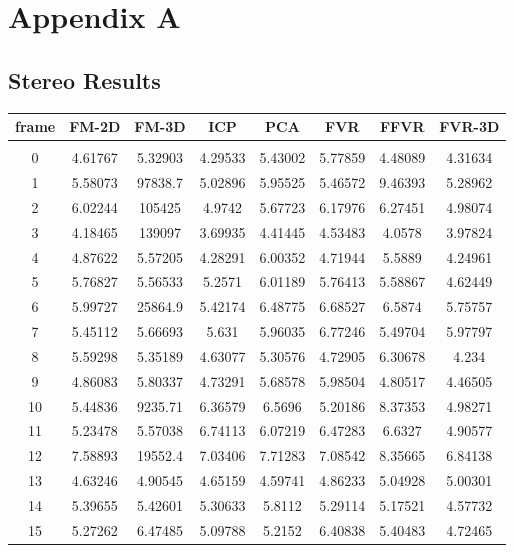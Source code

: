 \makeatletter
\chapter{Appendix A}
\label{RawQuantitative1}

\section{Stereo Results}
\label{StereoResultsRaw}

\begin{center}
\begin{longtable}{cccccccc}
\hline
\textbf{frame} & \textbf{FM-2D} & \textbf{FM-3D} & \textbf{ICP} & \textbf{PCA} & \textbf{FVR} & \textbf{FFVR} & \textbf{FVR-3D} \\
\hline \\
0 & 4.61767 & 5.32903 & 4.29533 & 5.43002 & 5.77859 & 4.48089 & 4.31634\\
1 & 5.58073 & 97838.7 & 5.02896 & 5.95525 & 5.46572 & 9.46393 & 5.28962\\
2 & 6.02244 & 105425 & 4.9742 & 5.67723 & 6.17976 & 6.27451 & 4.98074\\
3 & 4.18465 & 139097 & 3.69935 & 4.41445 & 4.53483 & 4.0578 & 3.97824\\
4 & 4.87622 & 5.57205 & 4.28291 & 6.00352 & 4.71944 & 5.5889 & 4.24961\\
5 & 5.76827 & 5.56533 & 5.2571 & 6.01189 & 5.76413 & 5.58867 & 4.62449\\
6 & 5.99727 & 25864.9 & 5.42174 & 6.48775 & 6.68527 & 6.5874 & 5.75757\\
7 & 5.45112 & 5.66693 & 5.631 & 5.96035 & 6.77246 & 5.49704 & 5.97797\\
8 & 5.59298 & 5.35189 & 4.63077 & 5.30576 & 4.72905 & 6.30678 & 4.234\\
9 & 4.86083 & 5.80337 & 4.73291 & 5.68578 & 5.98504 & 4.80517 & 4.46505\\
10 & 5.44836 & 9235.71 & 6.36579 & 6.5696 & 5.20186 & 8.37353 & 4.98271\\
11 & 5.23478 & 5.57038 & 6.74113 & 6.07219 & 6.47283 & 6.6327 & 4.90577\\
12 & 7.58893 & 19552.4 & 7.03406 & 7.71283 & 7.08542 & 8.35665 & 6.84138\\
13 & 4.63246 & 4.90545 & 4.65159 & 4.59741 & 4.86233 & 5.04928 & 5.00301\\
14 & 5.39655 & 5.42601 & 5.30633 & 5.8112 & 5.29114 & 5.17521 & 4.57732\\
15 & 5.27262 & 6.47485 & 5.09788 & 5.2152 & 6.40838 & 5.40483 & 4.72465\\

\end{longtable}
\end{center}
